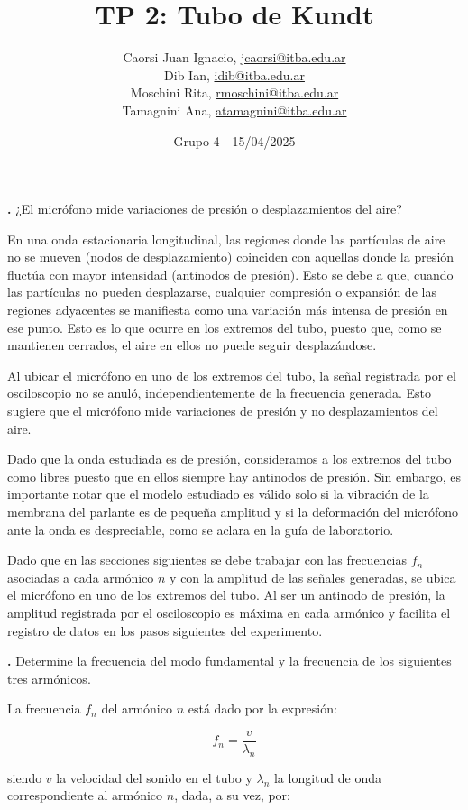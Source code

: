 \documentclass[12pt, a4paper]{article}
\title{TP 2: Tubo de Kundt}
\author
{
  Caorsi Juan Ignacio, \href{jcaorsi@itba.edu.ar}{jcaorsi@itba.edu.ar} \\
  Dib Ian, \href{idib@itba.edu.ar}{idib@itba.edu.ar} \\
  Moschini Rita, \href{rmoschini@itba.edu.ar}{rmoschini@itba.edu.ar} \\
  Tamagnini Ana, \href{atamagnini@itba.edu.ar}{atamagnini@itba.edu.ar}
}
\date{Grupo 4 - 15/04/2025}
\newcounter{step}
\newcommand{\step}[1]
{
  \par\vspace{2ex}
  \stepcounter{step}
  \noindent\textbf{\arabic{step}.} #1\par\vspace{1ex}
}
\begin{document}
\maketitle


\step{¿El micrófono mide variaciones de presión o desplazamientos del aire?}

En una onda estacionaria longitudinal, las regiones donde las partículas de aire no se mueven (nodos de desplazamiento) coinciden con aquellas donde la presión fluctúa con mayor intensidad (antinodos de presión). Esto se debe a que, cuando las partículas no pueden desplazarse, cualquier compresión o expansión de las regiones adyacentes se manifiesta como una variación más intensa de presión en ese punto. Esto es lo que ocurre en los extremos del tubo, puesto que, como se mantienen cerrados, el aire en ellos no puede seguir desplazándose.

Al ubicar el micrófono en uno de los extremos del tubo, la señal registrada por el osciloscopio no se anuló, independientemente de la frecuencia generada. Esto sugiere que el micrófono mide variaciones de presión y no desplazamientos del aire.

Dado que la onda estudiada es de presión, consideramos a los extremos del tubo como libres puesto que en ellos siempre hay antinodos de presión. Sin embargo, es importante notar que el modelo estudiado es válido solo si la vibración de la membrana del parlante es de pequeña amplitud y si la deformación del micrófono ante la onda es despreciable, como se aclara en la guía de laboratorio.

Dado que en las secciones siguientes se debe trabajar con las frecuencias $f_{n}$ asociadas a cada armónico $n$ y con la amplitud de las señales generadas, se ubica el micrófono en uno de los extremos del tubo. Al ser un antinodo de presión, la amplitud registrada por el osciloscopio es máxima en cada armónico y facilita el registro de datos en los pasos siguientes del experimento.


\step{Determine la frecuencia del modo fundamental y la frecuencia de los siguientes tres armónicos.}

La frecuencia $f_{n}$ del armónico $n$ está dado por la expresión:

\begin{equation}
    f_{n} = \frac{v}{\lambda_{n}}
  \label{equation1}
\end{equation}

siendo $v$ la velocidad del sonido en el tubo y $\lambda_{n}$ la longitud de onda correspondiente al armónico $n$, dada, a su vez, por:
\end{document}
